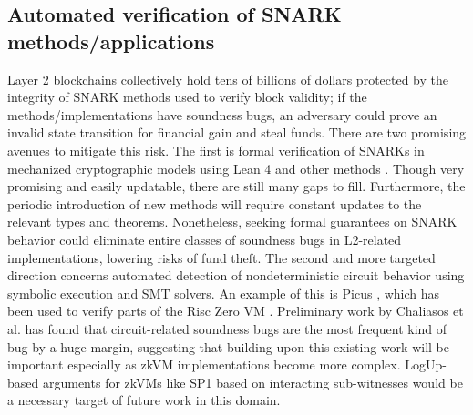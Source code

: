 \subsection{Automated verification of SNARK methods/applications}
\noindent Layer 2 blockchains collectively hold tens of billions of dollars \cite{l2beat} protected by the integrity of SNARK methods used to verify block validity; if the methods/implementations have soundness bugs, an adversary could prove an invalid state transition for financial gain and steal funds. There are two promising avenues to mitigate this risk. The first is formal verification of SNARKs in mechanized cryptographic models using Lean 4 and other methods \cite{arklib, lean4, joltfv}. Though very promising and easily updatable, there are still many gaps to fill. Furthermore, the periodic introduction of new methods will require constant updates to the relevant types and theorems. Nonetheless, seeking formal guarantees on SNARK behavior could eliminate entire classes of soundness bugs in L2-related implementations, lowering risks of fund theft. The second and more targeted direction concerns automated detection of nondeterministic circuit behavior using symbolic execution and SMT solvers. An example of this is Picus \cite{picus}, which has been used to verify parts of the Risc Zero VM \cite{risc0}. Preliminary work by Chaliasos et al. \cite{sok} has found that circuit-related soundness bugs are the most frequent kind of bug by a huge margin, suggesting that building upon this existing work will be important especially as zkVM implementations become more complex. LogUp-based arguments \cite{logup} for zkVMs like SP1 \cite{sp1} based on interacting sub-witnesses would be a necessary target of future work in this domain.

%


